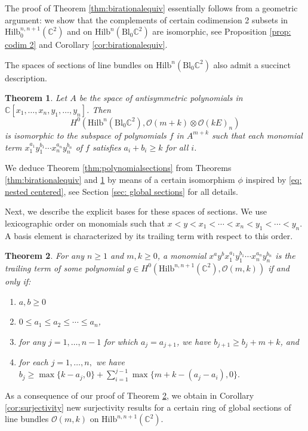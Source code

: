 \documentclass[12pt]{amsart}
\newcommand{\Hilb}{\mathrm{Hilb}}
\newcommand{\C}{\mathbb{C}}
\newcommand{\CO}{\mathcal{O}}
\newcommand{\Bl}{\mathrm{Bl}}
\numberwithin{equation}{section}
\newtheorem{theorem}{Theorem}[section]
\theoremstyle{definition}
\begin{document}
The proof of Theorem \ref{thm:birationalequiv} essentially follows from a geometric argument: we show that the complements of certain codimension 2 subsets in $\Hilb^{n,n+1}_0(\C^2)$ and on $\Hilb^n (\mathrm{Bl}_0 \C^2)$ are isomorphic, see Proposition \ref{prop: codim 2} and Corollary \ref{cor:birationalequiv}. 

The spaces of sections of line bundles on $\Hilb^n(\Bl_0\C^2)$ also admit a succinct description.

\begin{theorem}
\label{thm: sections blowup intro}
Let $A$ be the space of antisymmetric polynomials in $\C[x_1,\ldots,x_n,y_1,\ldots,y_n]$. Then
$$
H^0\left(\Hilb^n (\mathrm{Bl}_0 \C^2),\CO(m+k)\otimes \CO(kE)_n\right)
$$
is isomorphic to the subspace of polynomials $f$ in $A^{m+k}$ such that each monomial term $x_1^{a_1}y_1^{b_1} \cdots x_n^{a_n}y_n^{b_n}$ of $f$ satisfies $a_i+b_i \geq k$ for all $i$. 
\end{theorem}

We deduce Theorem \ref{thm:polynomialsections} from Theorems \ref{thm:birationalequiv} and \ref{thm: sections blowup intro} by means of a certain isomorphism $\phi$ inspired by \eqref{eq: nested centered}, see Section \ref{sec: global sections} for all details.

Next, we describe the explicit bases for these spaces of sections. We use lexicographic order on monomials such that $x<y<x_1<\cdots<x_n<y_1<\cdots<y_n$.  A basis element is characterized by its trailing term with respect to this order. 

\begin{theorem}
\label{thm: basis nested intro}
For any $n\geq 1$ and $m,k\geq 0$, a monomial $x^a y^b x_1^{a_1}y_1^{b_1}\cdots x_n^{a_n}y_n^{b_n}$ is the trailing term of some polynomial $g\in  H^0\left(\Hilb^{n,n+1}(\C^2),\CO(m,k)\right)$ if and only if:
\begin{enumerate}
    \item $a,b\geq 0$
    \item $0\leq a_1\leq a_2 \leq \cdots \leq a_n$,
    \item for any $j=1,\dots,n-1$ for which $a_j = a_{j+1}$, we have $b_{j+1}\geq b_j+m+k$, and
    \item for each $j=1,\dots,n,$ we have $b_j\geq \max\{k-a_j,0\} + \sum_{i=1}^{j-1}\max\{m+k-(a_j-a_i),0\}.$
    \end{enumerate}
\end{theorem}

As a consequence of our proof of Theorem \ref{thm: basis nested intro}, we obtain in Corollary \ref{cor:surjectivity} new surjectivity results for a certain ring of global sections of line bundles $\CO(m,k)$ on $\Hilb^{n,n+1}(\C^2).$
\end{document}
